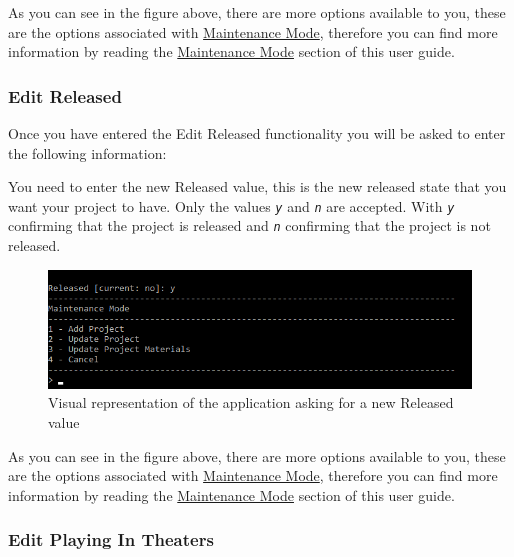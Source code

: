 \documentclass[
  english,
  a4paper,
,tablecaptionabove
]{scrartcl}
\begin{document}
As you can see in the figure above, there are more options available to
you, these are the options associated with
\protect\hyperlink{using-maintenance-mode}{Maintenance Mode}, therefore
you can find more information by reading the
\protect\hyperlink{using-maintenance-mode}{Maintenance Mode} section of
this user guide.

\newpage

\hypertarget{edit-released-1}{%
\subsubsection{Edit Released}\label{edit-released-1}}

Once you have entered the Edit Released functionality you will be asked
to enter the following information:

You need to enter the new Released value, this is the new released state
that you want your project to have. Only the values \emph{\texttt{y}}
and \emph{\texttt{n}} are accepted. With \emph{\texttt{y}} confirming
that the project is released and \emph{\texttt{n}} confirming that the
project is not released.

\begin{figure}
\centering
\includegraphics{images/user-guide/maintenance-mode/update-project-released.png}
\caption{Visual representation of the application asking for a new
Released value}
\end{figure}

As you can see in the figure above, there are more options available to
you, these are the options associated with
\protect\hyperlink{using-maintenance-mode}{Maintenance Mode}, therefore
you can find more information by reading the
\protect\hyperlink{using-maintenance-mode}{Maintenance Mode} section of
this user guide.

\newpage

\hypertarget{edit-playing-in-theaters-1}{%
\subsubsection{Edit Playing In
Theaters}\label{edit-playing-in-theaters-1}}
\end{document}
